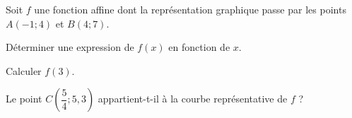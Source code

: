 \documentclass[12pt,a4paper]{book}
\begin{document}
\exerciceDS{}

Soit $f$ une fonction affine dont la représentation graphique passe par les points $A(-1 ; 4)$ et $B(4 ; 7)$.
\begin{enumMet}
	\item Déterminer une expression de $f(x)$ en fonction de $x$.
	\item Calculer $f(3)$. 

%
%

	\item Le point $C\left(\dfrac{5}{4} ; 5,3\right)$ appartient-t-il à la courbe représentative de $f$ ?
\end{enumMet}
\end{document}
